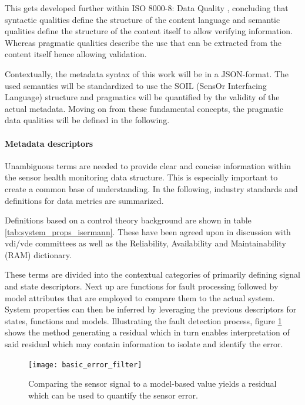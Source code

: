 This gets developed further within ISO 8000-8: Data Quality \cite{iso_data-quality_information_2015}, concluding that syntactic qualities define the structure of the content language and semantic qualities define the structure of the content itself to allow verifying information. Whereas pragmatic qualities describe the use that can be extracted from the content itself hence allowing validation.

Contextually, the metadata syntax of this work will be in a JSON-format. The used semantics will be standardized to use the SOIL (SensOr Interfacing Language) structure and pragmatics will be quantified by the validity of the actual metadata. Moving on from these fundamental concepts, the pragmatic data qualities will be defined in the following.

\paragraph{Metadata descriptors}

Unambiguous terms are needed to provide clear and concise information within the sensor health monitoring data structure. This is especially important to create a common base of understanding. In the following, industry standards and definitions for data metrics are summarized.

Definitions based on a control theory background are shown in table \ref{tab:system_props_isermann}. These have been agreed upon in discussion with vdi/vde committees as well as the Reliability, Availability and Maintainability (RAM) dictionary. \cite{isermann_trends_nodate,din_din25424_fehlerbaumanalysepdf_1977}

These terms are divided into the contextual categories of primarily defining signal and state descriptors. Next up are functions for fault processing followed by model attributes that are employed to compare them to the actual system. System properties can then be inferred by leveraging the previous descriptors for states, functions and models. Illustrating the fault detection process, figure \ref{fig:basic_error_filter} shows the method generating a residual which in turn enables interpretation of said residual which may contain information to isolate and identify the error.


\begin{figure}[ht]
    \centering
    \texttt{[image: basic\_error\_filter]}
    \caption[Model-Based Sensor Monitoring]{Comparing the sensor signal to a model-based value yields a residual which can be used to quantify the sensor error.}
    \label{fig:basic_error_filter}
\end{figure}





